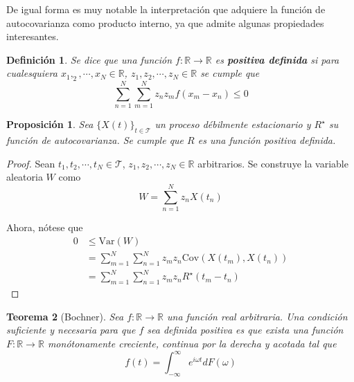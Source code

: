 \documentclass[12pt,letterpaper]{book}
\newtheorem{definicion}{Definición}[chapter]
\newtheorem{teorema}{Teorema}[chapter]
\newtheorem{proposicion}[teorema]{Proposición}
\newcommand{\R}{\mathbb{R}}
\newcommand{\intR}{\int_{-\infty}^{\infty}}
\newcommand{\Var}[1]{\mathrm{Var}\left( #1 \right)}
\newcommand{\Cov}[1]{\mathrm{Cov}\left( #1 \right)}
\newcommand{\xt}{$\{X(t)\}_{t\in \mathcal{T}}$ }
\begin{document}
De igual forma es muy notable la interpretación que adquiere la función de autocovarianza como producto interno, ya que admite algunas propiedades interesantes.

\begin{definicion}
Se dice que una función $f: \R\rightarrow \R$ es \textbf{positiva definida} si para cualesquiera $x_1, _2, \cdots, x_N \in \R$, $z_1, z_2, \cdots, z_N \in \R$ se cumple que 
\begin{equation}
\sum_{n=1}^{N} \sum_{m=1}^{N} z_n z_m f(x_m-x_n) \leq 0
\end{equation}
\end{definicion}
\newpage

\begin{proposicion}
\label{lazy:meh}
Sea \xt un proceso débilmente estacionario y $R^\star$ su función de autocovarianza. Se cumple que $R$ es una función positiva definida.
\end{proposicion}

\begin{proof}
Sean $t_1, t_2, \cdots, t_N \in \mathcal{T}$, $z_1, z_2, \cdots, z_N \in \R$ arbitrarios. Se construye la variable aleatoria $W$ como
\begin{equation}
W = \sum_{n=1}^{N} z_n X(t_n)
\end{equation}

Ahora, nótese que
\begin{align*}
0 &\leq \Var{W} \\
&= \sum_{m=1}^{N} \sum_{n=1}^{N} z_m z_n \Cov{X(t_m),X(t_n)} \\
&= \sum_{m=1}^{N} \sum_{n=1}^{N} z_m z_n R^\star(t_m-t_n)
\end{align*}
\end{proof}

\begin{teorema}[Bochner]
Sea $f:\R\rightarrow \R$ una función real arbitraria. Una condición suficiente y necesaria para que $f$ sea definida positiva es que exista una función $F:\R\rightarrow \R$ monótonamente creciente, continua por la derecha y acotada tal que
\begin{equation}
f(t) = \intR e^{i \omega t} dF(\omega)
\end{equation}
\end{teorema}
\end{document}

